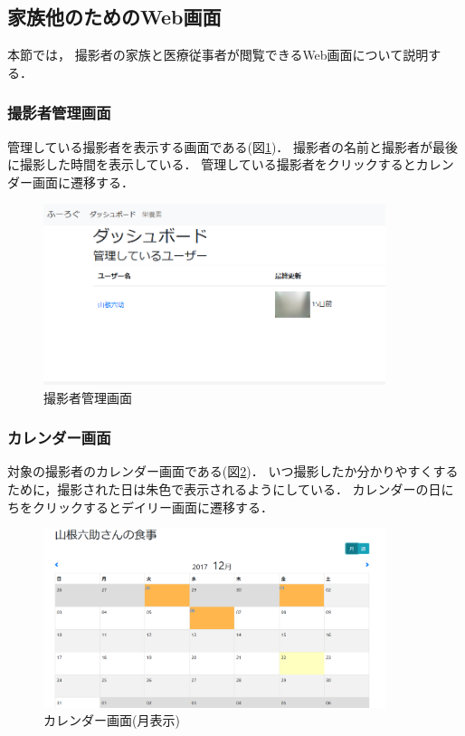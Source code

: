 \documentclass[../report]{subfiles}
\begin{document}
\subsection{家族他のためのWeb画面}
本節では， 撮影者の家族と医療従事者が閲覧できるWeb画面について説明する．

\subsubsection{撮影者管理画面}
管理している撮影者を表示する画面である(図\ref{fig:5_dashboard})．
撮影者の名前と撮影者が最後に撮影した時間を表示している．
管理している撮影者をクリックするとカレンダー画面に遷移する．

\begin{figure}[htbp]
    \begin{center}
        \includegraphics[width=10cm]{imgs/5_dashboard.png}
        \caption{撮影者管理画面}
        \label{fig:5_dashboard}
    \end{center}
\end{figure}

\subsubsection{カレンダー画面}
対象の撮影者のカレンダー画面である(図\ref{fig:5_calendar-month})．
いつ撮影したか分かりやすくするために，撮影された日は朱色で表示されるようにしている．
カレンダーの日にちをクリックするとデイリー画面に遷移する．

\begin{figure}[htbp]
    \begin{center}
        \includegraphics[width=10cm]{imgs/5_month.png}
        \caption{カレンダー画面(月表示)}
        \label{fig:5_calendar-month}
    \end{center}
\end{figure}
\end{document}
